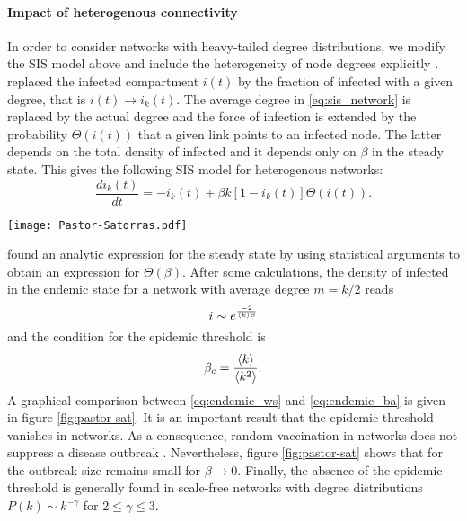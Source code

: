 \documentclass[openright,twoside,headsepline]{scrbook}
\begin{document}
\paragraph{Impact of heterogenous connectivity\color{Cayenne}{.}}
In order to consider networks with heavy-tailed degree distributions, we modify the SIS model above and include the heterogeneity of node degrees explicitly \citep{Pastor-Satorras_vespi:2001}.
\citeauthor{Pastor-Satorras_vespi:2001} replaced the infected compartment $i(t)$ by the fraction of infected with a given degree, that is $i(t)\rightarrow i_k(t)$.
The average degree in \eqref{eq:sis_network} is replaced by the actual degree and the force of infection is extended by the probability $\Theta (i(t))$ that a given link points to an infected node.
The latter depends on the total density of infected and it depends only on $\beta $ in the steady state.
This gives the following SIS model for heterogenous networks:
\begin{equation}\label{eq:sis_het_network}
\frac{di_k(t)}{dt}=-i_k(t)+\beta k [1-i_k(t)] \Theta (i(t)).
\end{equation}
%
\begin{SCfigure}
\texttt{[image: Pastor-Satorras.pdf]}
\caption{Fraction of infected in the endemic state for an SIS model.
The figure reveals the disappearance of the epidemic threshold for in \BA networks (red).
The epidemic threshold remains finite (here: $\beta _c=1/6$) for homogenous networks and $\beta _c \rightarrow 0$ for \BA networks.
From \citet{Pastor-Satorras_vespi:2001}.
}
\label{fig:pastor-sat}
\end{SCfigure}

%
\citeauthor{Pastor-Satorras_vespi:2001} found an analytic expression for the steady state by using statistical arguments to obtain an expression for $\Theta (\beta )$.
After some calculations, the density of infected in the endemic state for a \BA network with average degree $m=k/2$ reads
\begin{equation}\label{eq:endemic_ba}
i \sim e^{\frac{-2}{\left< k \right>\beta }}
\end{equation}
and the condition for the epidemic threshold is \citep{pastor-sat_2}
\begin{equation}\label{eq:degree_threshold}
\beta _c=\frac{\left< k \right>}{\left< k^2 \right>} .
\end{equation}
A graphical comparison between \eqref{eq:endemic_ws} and \eqref{eq:endemic_ba} is given in figure \ref{fig:pastor-sat}.
It is an important result that the epidemic threshold vanishes in \BA networks.
As a consequence, random vaccination in \BA networks does not suppress a disease outbreak \citep{Keeling:2005}.
Nevertheless, figure \ref{fig:pastor-sat} shows that for the outbreak size remains small for $\beta \rightarrow 0$.
Finally, the absence of the epidemic threshold is generally found in scale-free networks with degree distributions $P(k)\sim k^{-\gamma }$ for $2\leqslant \gamma \leqslant 3$.
\end{document}
